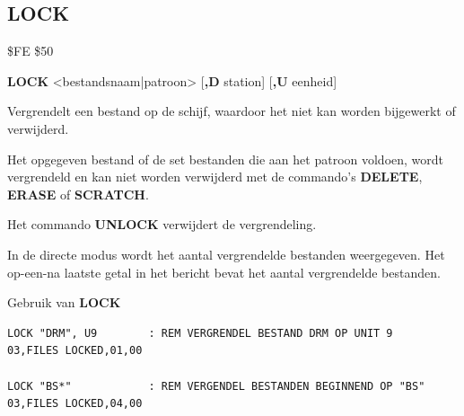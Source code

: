 \subsection{LOCK}
\begin{description}[leftmargin=2cm,style=nextline]
\item [Token:]    \$FE \$50

\item [Formaat:]   {\bf LOCK} <bestandsnaam|patroon> [{\bf,D} station] [{\bf,U} eenheid]

\item [Gebruik:]    Vergrendelt een bestand op de schijf, waardoor het niet kan worden bijgewerkt of verwijderd.

                  Het opgegeven bestand of de set bestanden die aan het patroon voldoen, wordt vergrendeld en kan niet worden verwijderd met de commando's {\bf DELETE}, {\bf ERASE} of {\bf SCRATCH}.

                  Het commando {\bf UNLOCK} verwijdert de vergrendeling.

                  \filenamedefinition

                  \drivedefinition

                  \unitdefinition

\item [Opmerkingen:]  In de directe modus wordt het aantal vergrendelde bestanden weergegeven. Het op-een-na laatste getal in het bericht bevat het aantal vergrendelde bestanden.

\item [Voorbeelden:] Gebruik van {\bf LOCK}

\begin{tcolorbox}[colback=black,coltext=white]
\verbatimfont{\codefont}
\begin{verbatim}
LOCK "DRM", U9        : REM VERGRENDEL BESTAND DRM OP UNIT 9
03,FILES LOCKED,01,00

LOCK "BS*"            : REM VERGENDEL BESTANDEN BEGINNEND OP "BS"
03,FILES LOCKED,04,00
\end{verbatim}
\end{tcolorbox}
\end{description}


\newpage
